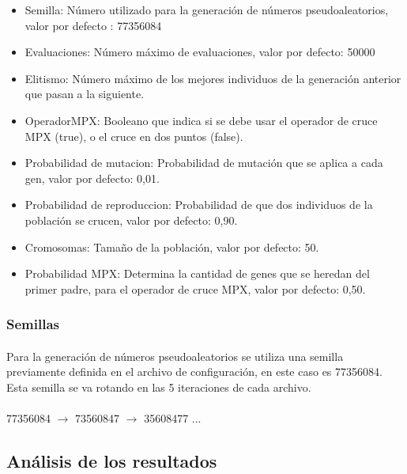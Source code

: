 		\begin{itemize}
			
			\item Semilla: Número utilizado para la generación de números pseudoaleatorios, valor por defecto : 77356084
			\item Evaluaciones:  Número máximo de evaluaciones, valor por defecto: 50000
			\item Elitismo: Número máximo de los mejores individuos de la generación anterior que pasan a la siguiente.
			\item OperadorMPX: Booleano que indica si se debe usar el operador de cruce MPX (true), o el cruce en dos puntos (false).
			\item Probabilidad de mutacion: Probabilidad de mutación que se aplica a cada gen, valor por defecto: 0,01.
			\item Probabilidad de reproduccion: Probabilidad de que dos individuos de la población se crucen, valor por defecto: 0,90.
			\item Cromosomas: Tamaño de la población, valor por defecto: 50.
			\item Probabilidad MPX: Determina la cantidad de genes que se heredan del primer padre, para el operador de cruce MPX, valor por defecto: 0,50.
			
		\end{itemize}

	
	\subsubsection{Semillas}
	
	\paragraph{}Para la generación de números pseudoaleatorios se utiliza una semilla previamente definida en el archivo de configuración, en este caso es 77356084. Esta semilla se va rotando en las 5 iteraciones de cada archivo.
	
	
	\paragraph{} 77356084 $\rightarrow$ 73560847 $\rightarrow$ 35608477  ...
	
	
	\subsection{Análisis de los resultados}
	
